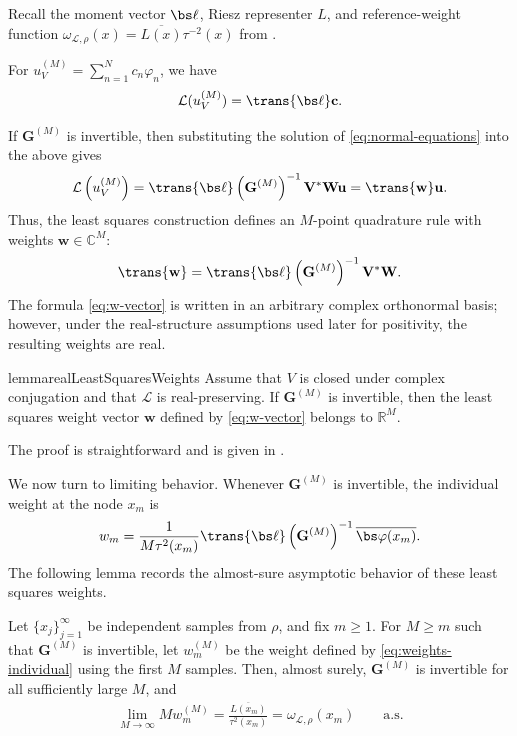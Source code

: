 \documentclass[10pt,dvipsnames]{amsart}
\begin{document}
Recall the moment vector \(\bs\ell\), Riesz representer \(L\), and
reference-weight function
\(
    \omega_{\mathcal L, \rho}(x)
    =\overline{L(x)}\tau^{-2}(x)
\)
from .

For
\(u_V^{(M)}=\sum_{n=1}^N c_n\varphi_n\), we have 
\[
    \mathcal L(u_V^{(M)})
    =
    \trans{\bs\ell}\mathbf c.
\]

If $\mathbf G^{(M)}$ is invertible, then substituting the solution of \eqref{eq:normal-equations} into the above gives
\begin{align}
    \label{eq:weights-explicit}
    \mathcal L\left(u_V^{(M)}\right)
    =
    \trans{\bs\ell}
    \left(\mathbf G^{(M)}\right)^{-1}
    \mathbf V^*\mathbf W\mathbf u
    =
    \trans{\mathbf w}\mathbf u.
\end{align}
Thus, the least squares construction defines an $M$-point quadrature rule with weights $\mathbf w\in\mathbb C^M$:
\begin{align}
    \label{eq:w-vector}
    \trans{\mathbf w}
    =
    \trans{\bs\ell}
    \left(\mathbf G^{(M)}\right)^{-1}
    \mathbf V^*\mathbf W.
\end{align}
The formula \eqref{eq:w-vector} is written in an arbitrary complex
orthonormal basis; however, under the real-structure assumptions used later for
positivity, the resulting weights are real.

\begin{restatable}{lemma}{realLeastSquaresWeights}
\label{lemma:real-ls-weights}
Assume that \(V\) is closed under complex conjugation and that
\(\mathcal L\) is real-preserving.  If \(\mathbf G^{(M)}\) is invertible,
then the least squares weight vector \(\mathbf w\) defined by
\eqref{eq:w-vector} belongs to \(\mathbb R^M\).
\end{restatable}
\noindent The proof is straightforward and is given in . 


We now turn to limiting behavior. Whenever \(\mathbf G^{(M)}\) is invertible,
the individual weight at the node \(x_m\) is
\begin{align}
    \label{eq:weights-individual}
    w_m
    =
    \frac{1}{M\tau^2(x_m)}
    \trans{\bs\ell}
    \left(\mathbf G^{(M)}\right)^{-1}
    \overline{\bs\varphi(x_m)}.
\end{align}
The following lemma records the almost-sure asymptotic behavior of these least squares weights.

\begin{lemma}
\label{lemma:wm-asymptotic}
Let $\{x_j\}_{j=1}^\infty$ be independent samples from $\rho$, and fix
\(m\ge1\). For \(M\ge m\) such that \(\mathbf G^{(M)}\) is invertible, let
\(w_m^{(M)}\) be the weight defined by \eqref{eq:weights-individual} using
the first \(M\) samples. Then, almost surely, \(\mathbf G^{(M)}\) is
invertible for all sufficiently large \(M\), and
\begin{align*}
    \lim_{M\to\infty} M w_m^{(M)}
    =
    \frac{\overline{L(x_m)}}{\tau^2(x_m)} = \omega_{\mathcal L, \rho}(x_m)
    \qquad
    \text{a.s}.
\end{align*}
\end{lemma}
\end{document}
